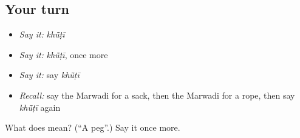 \subsection*{Your turn}
\begin{itemize}
\raggedright
  \item \emph{Say it:} \emph{khū̃ṭī}
  \item \emph{Say it:} \emph{khū̃ṭī}, once more
  \item \emph{Say it:} say \emph{khū̃ṭī}
  \item \emph{Recall:} say the Marwadi for a sack, then the Marwadi for a rope, then say \emph{khū̃ṭī} again
\end{itemize}

\begin{tcolorbox}[breakable,colback=teal!4,colframe=teal!35!black,title={Before you move on}]
What does  mean? (\textquotedblleft{}A peg\textquotedblright{}.) Say it once more.
\end{tcolorbox}
